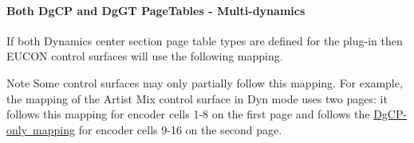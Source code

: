 \hypertarget{a00833_aax_page_table_guide_04_avid_center_section_page_tables_eucon_mapping_DgCPDgGT}{}\paragraph{Both \textquotesingle{}\+Dg\+C\+P\textquotesingle{} and \textquotesingle{}\+Dg\+G\+T\textquotesingle{} Page\+Tables -\/ Multi-\/dynamics}\label{a00833_aax_page_table_guide_04_avid_center_section_page_tables_eucon_mapping_DgCPDgGT}
 If both Dynamics center section page table types are defined for the plug-\/in then E\+U\+C\+ON control surfaces will use the following mapping.

\begin{DoxyNote}{Note}
Some control surfaces may only partially follow this mapping. For example, the mapping of the Artist Mix control surface in Dyn mode uses two pages\+: it follows this mapping for encoder cells 1-\/8 on the first page and follows the \mbox{\hyperlink{a00833_aax_page_table_guide_04_avid_center_section_page_tables_eucon_mapping_DgCP}{\textquotesingle{}Dg\+CP\textquotesingle{}-\/only mapping}} for encoder cells 9-\/16 on the second page.
\end{DoxyNote}
\tabulinesep=1mm
